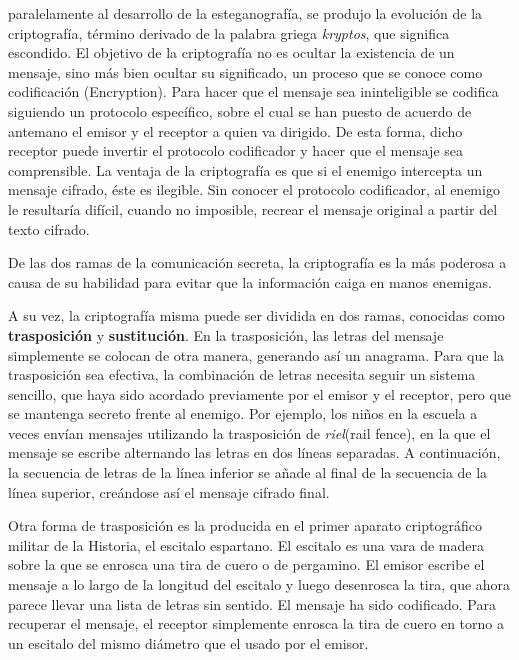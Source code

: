 	 paralelamente al desarrollo de la esteganografía, se produjo la evolución de la criptografía, término derivado de la palabra griega \textit{kryptos}, que significa escondido. El objetivo de la criptografía no es ocultar la existencia de un mensaje, sino más bien ocultar su significado, un proceso que se conoce como codificación (Encryption). Para hacer que el mensaje sea ininteligible se codifica siguiendo un protocolo específico, sobre el cual se han puesto de acuerdo de antemano el emisor y el receptor a quien va dirigido. De esta forma, dicho receptor puede invertir el protocolo codificador y hacer que el mensaje sea comprensible. La ventaja de la
criptografía es que si el enemigo intercepta un mensaje cifrado, éste es ilegible. Sin conocer el protocolo codificador, al enemigo le resultaría difícil, cuando no imposible, recrear el mensaje original a partir del texto cifrado.
	 
	 
	 De las dos ramas de la comunicación secreta, la criptografía es la más poderosa a causa de su habilidad para evitar que la información caiga en manos enemigas.
	 
	 
	A su vez, la criptografía misma puede ser dividida en dos ramas, conocidas como \textbf{trasposición} y \textbf{sustitución}. En la trasposición, las letras del mensaje simplemente se colocan de otra manera, generando así un anagrama. Para que la trasposición sea efectiva, la combinación de letras necesita seguir un sistema sencillo, que haya sido acordado previamente por el emisor y el receptor, pero que se mantenga secreto frente al enemigo. Por ejemplo, los niños en la escuela a veces envían mensajes utilizando la trasposición de \textit{riel}(rail fence), en la que el mensaje se escribe alternando las letras en dos líneas separadas. A continuación, la secuencia de letras de la línea inferior se añade al final de la secuencia de la línea superior, creándose así el mensaje cifrado final.
	
	Otra forma de trasposición es la producida en el primer aparato criptográfico militar de la Historia, el escitalo espartano.  El escitalo es una vara de madera sobre la que se enrosca una tira de cuero o de pergamino. El emisor escribe el mensaje a lo largo de la longitud del escitalo y luego desenrosca la tira, que ahora parece llevar una lista de letras sin sentido. El mensaje ha sido codificado. Para recuperar el mensaje, el receptor simplemente enrosca la tira de cuero en torno a un escitalo del mismo diámetro que el usado por el emisor.
	
